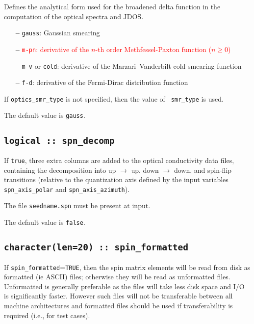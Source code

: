 Defines the analytical form used for the broadened delta function in
the computation of the optical spectra and JDOS.

\begin{itemize}
  
\item[{\bf --}]
  {\tt gauss}: Gaussian smearing

\item[{\bf --}]
  \textcolor{red}{{\tt m-pn}: derivative of the $n$-th order
    Methfessel-Paxton function ($n\geq 0$)}

\item[{\bf --}]
  {\tt m-v} or {\tt cold}: derivative of the Marzari--Vanderbilt cold-smearing function

\item[{\bf --}]
  {\tt f-d}: derivative of the Fermi-Dirac distribution function

\end{itemize}

If {\tt optics\_smr\_type} is not specified, then the value of {\tt
  smr\_type} is used.  

The default value is {\tt gauss}.

\subsection[spn\_decomp]{\tt logical :: spn\_decomp}
If {\tt true}, three extra columns are added to the optical
conductivity data files, containing the decomposition into up
$\rightarrow$ up, down $\rightarrow$ down, and spin-flip transitions
(relative to the quantization axis defined by the input variables {\tt
  spn\_axis\_polar} and {\tt spn\_axis\_azimuth}). 

The file {\tt seedname.spn} must be present at input.

The default value is \verb#false#.



\subsection[spin\_formated]{\tt character(len=20) :: spin\_formatted}

If \verb#spin_formatted#=\verb#TRUE#, then the spin matrix elements will be
read from disk as formatted (ie ASCII) files; otherwise they will be
read as unformatted files. Unformatted is generally preferable as the
files will take less disk space and I/O is significantly
faster. However such files will not be transferable between all
machine architectures and formatted files should be used if
transferability is required (i.e., for test cases).

